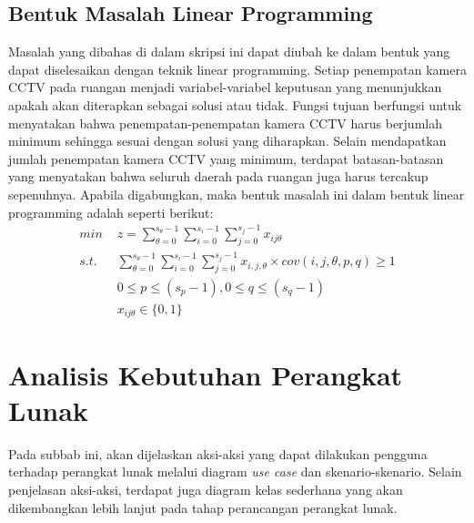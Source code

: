 \subsection{Bentuk Masalah Linear Programming}
Masalah yang dibahas di dalam skripsi ini dapat diubah ke dalam bentuk yang dapat diselesaikan dengan teknik linear programming. Setiap penempatan kamera CCTV pada ruangan menjadi variabel-variabel keputusan yang menunjukkan apakah akan diterapkan sebagai solusi atau tidak. Fungsi tujuan berfungsi untuk menyatakan bahwa penempatan-penempatan kamera CCTV harus berjumlah minimum sehingga sesuai dengan solusi yang diharapkan. Selain mendapatkan jumlah penempatan kamera CCTV yang minimum, terdapat batasan-batasan yang menyatakan bahwa seluruh daerah pada ruangan juga harus tercakup sepenuhnya. Apabila digabungkan, maka bentuk masalah ini dalam bentuk linear programming adalah seperti berikut:
\begin{equation*}
	\begin{split}
		\textit{min } & z = \sum_{\theta=0}^{s_{\theta}-1} \sum_{i=0}^{s_i-1} \sum_{j=0}^{s_j-1} x_{ij\theta}\\
		\textit{s.t. } & \sum_{\theta=0}^{s_{\theta}-1} \sum_{i=0}^{s_i-1} \sum_{j=0}^{s_j-1} x_{i,j,\theta} \times cov(i,j,\theta,p,q) \geq 1\\
		& 0 \leq p \leq (s_p - 1), 0 \leq q \leq (s_q - 1)\\
		& x_{ij\theta} \in \{0,1\}
	\end{split}
\end{equation*}

\section{Analisis Kebutuhan Perangkat Lunak}
Pada subbab ini, akan dijelaskan aksi-aksi yang dapat dilakukan pengguna terhadap perangkat lunak melalui diagram \textit{use case} dan skenario-skenario. Selain penjelasan aksi-aksi, terdapat juga diagram kelas sederhana yang akan dikembangkan lebih lanjut pada tahap perancangan perangkat lunak. 

